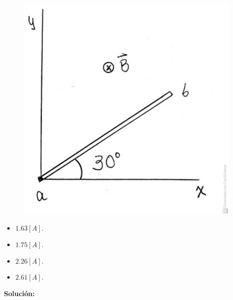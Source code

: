 \documentclass[letter,11pt]{article}
\begin{document}
\begin{enumerate}
\begin{figure}[!h]
\centering
\includegraphics[scale=0.70]{resources/q10.eps}
\end{figure}

\begin{itemize}
    \item $1.63 [A]$.
    \item $1.75 [A]$.
    \item $2.26 [A]$.
    \item $2.61 [A]$.
\end{itemize}

\textbf{Solución:}

\end{enumerate}
\end{document}
